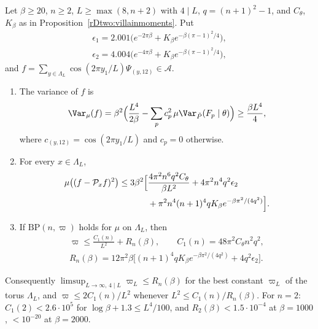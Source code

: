\begin{theorem}\label{rDtwo:villaintorus}
Let $\beta\ge20$, $n\ge2$, $L\ge\max(8,n+2)$ with $4\mid L$, $q=(n+1)^2-1$,
and $C_\theta$, $K_\beta$ as in Proposition~\ref{rDtwo:villainmoments}. Put
\begin{gather*}
\epsilon_1=2.001\bigl(e^{-2\pi\beta}+K_\beta e^{-\beta(\pi-1)^2/4}\bigr),\\
\epsilon_2=4.004\bigl(e^{-4\pi\beta}+K_\beta e^{-\beta(\pi-1)^2/4}\bigr),
\end{gather*}
and $f=\sum_{y\in\Lambda_L}\cos(2\pi y_1/L)\Psi_{(y,12)}\in\mathcal A$.
\begin{enumerate}[label=\textup{(\roman*)},leftmargin=*]
\item The variance of $f$ is
\[
\Var_\mu(f)=\beta^2\Bigl(\frac{L^4}{2\beta}-\sum_pc_p^2\,\mu\Var_{\tilde P}(F_p
\mid\theta)\Bigr)\ge\frac{\beta L^4}4,
\]
where $c_{(y,12)}=\cos(2\pi y_1/L)$ and
$c_p=0$ otherwise.
\item For every $x\in\Lambda_L$,
\[
\begin{split}
\mu\bigl((f-\mathcal P_xf)^2\bigr)\le3\beta^2\Bigl[&\frac{4\pi^2n^6q^2C_\theta}
{\beta L^2}+4\pi^2n^4q^2\epsilon_2\\
&+\pi^2n^4(n+1)^4qK_\beta e^{-\beta\pi^2/(4q^2)}\Bigr].
\end{split}
\]
\item If $\mathrm{BP}(n,\varpi)$ holds for $\mu$ on $\Lambda_L$, then
\begin{gather*}
\varpi\le\frac{C_1(n)}{L^2}+R_n(\beta),\qquad C_1(n)=48\pi^2C_\theta n^2q^2,\\
R_n(\beta)=12\pi^2\beta\bigl[(n+1)^4qK_\beta e^{-\beta\pi^2/(4q^2)}
+4q^2\epsilon_2\bigr].
\end{gather*}
\end{enumerate}
Consequently $\limsup_{L\to\infty,\,4\mid L}\varpi_L\le R_n(\beta)$ for the
best constant $\varpi_L$ of the torus $\Lambda_L$, and $\varpi\le2C_1(n)/L^2$
whenever $L^2\le C_1(n)/R_n(\beta)$. For $n=2$: $C_1(2)<2.6\cdot10^5$ for
$\log\beta+1.3\le L^4/100$, and $R_2(\beta)<1.5\cdot10^{-4}$ at $\beta=1000$,
$<10^{-20}$ at $\beta=2000$.
\end{theorem}

